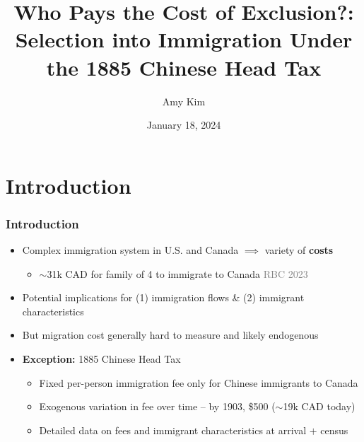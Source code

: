 \documentclass[xcolor=dvipsnames, compress, 12pt, aspectratio=169, handout]{beamer}
\title{Who Pays the Cost of Exclusion?: Selection into Immigration Under the 1885 Chinese Head Tax}
\author{Amy Kim}
\institute{Princeton University}
\date{January 18, 2024}
\begin{document}
\begin{frame}[plain]
    \titlepage
\end{frame}

\section{Introduction}
\begin{frame}
    \frametitle{Introduction}
    \begin{itemize}
        \item Complex immigration system in U.S. and Canada $\implies$ variety of \textbf{costs} 
        \vspace{1mm}
        \begin{itemize}
            \item $\sim$31k CAD for family of 4 to immigrate to Canada \textcolor{gray}{RBC 2023}
        \end{itemize}
        \vspace{2mm}
        \item Potential implications for (1) immigration flows \& (2) immigrant characteristics
        \vspace{2mm}
        \item But migration cost generally hard to measure and likely endogenous
        \vspace{2mm}
        \item \textbf{Exception:} 1885 Chinese Head Tax
        \begin{itemize}
            \vspace{1mm}
            \item Fixed per-person immigration fee only for Chinese immigrants to Canada
            \vspace{1mm}
            \item Exogenous variation in fee over time -- by 1903, \$500 ($\sim$19k CAD today)
            \vspace{1mm}
            \item Detailed data on fees and immigrant characteristics at arrival $+$ census 
        \end{itemize}
    \end{itemize}
\end{frame}
\end{document}
